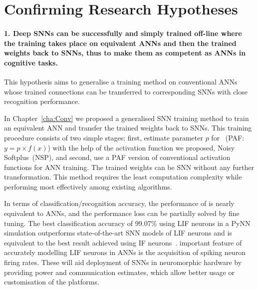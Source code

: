 \section{Confirming Research Hypotheses}
\paragraph{1. Deep SNNs can be successfully and simply trained off-line where the training takes place on equivalent ANNs and then \DIFdelbegin {}\DIFdelend the trained weights \DIFaddbegin {}\DIFaddend back to \DIFaddbegin {}\DIFaddend SNNs, thus to make them as competent as \DIFaddbegin {}\DIFaddend ANNs in cognitive tasks.}
This hypothesis aims to generalise a training method on conventional ANNs whose trained connections can be transferred to corresponding SNNs with close recognition performance.

In Chapter~\ref{cha:Conv} we proposed a generalised SNN training method to train an equivalent ANN and transfer the trained weights back to SNNs.
This training procedure consists of two simple stages: first, estimate parameter $p$ for \DIFdelbegin {}\DIFdelend \DIFaddbegin {}\DIFaddend ~(PAF: $y = p \times f(x)$) with the help of the activation function we proposed, Noisy Softplus~(NSP), and second, use a PAF version of \DIFaddbegin {}\DIFaddend conventional activation functions for ANN training. %
The trained weights can be \DIFdelbegin {}\DIFdelend \DIFaddbegin {}\DIFaddend SNN without any further transformation.
This method requires the least computation complexity while performing most effectively among existing algorithms.

In terms of classification/recognition accuracy, the performance of \DIFdelbegin {}\DIFdelend \DIFaddbegin {}\DIFaddend is nearly equivalent to ANNs, and the performance loss can be partially solved by fine tuning.
The best classification accuracy of 99.07\% using LIF neurons in a PyNN simulation outperforms state-of-the-art SNN models of LIF neurons and is equivalent to the best result achieved using IF neurons~\citep{diehl2015fast}.
\DIFdelbegin {}\DIFdelend \DIFaddbegin {}\DIFaddend important feature of accurately modelling LIF neurons in ANNs is the acquisition of spiking neuron firing rates. These will aid deployment of SNNs in neuromorphic hardware by providing power and communication estimates, which \DIFdelbegin {}\DIFdelend allow better usage or customisation of the platforms.


